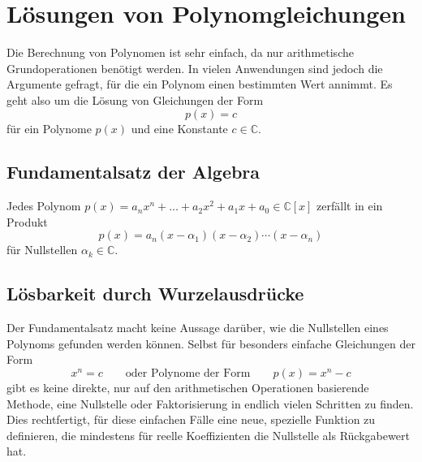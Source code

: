 %
%
%
\section{Lösungen von Polynomgleichungen
\label{buch:potenzen:section:loesungen}}
Die Berechnung von Polynomen ist sehr einfach, da nur arithmetische 
Grundoperationen benötigt werden.
In vielen Anwendungen sind jedoch die Argumente gefragt, für die ein
Polynom einen bestimmten Wert annimmt.
Es geht also um die Lösung von Gleichungen der Form
\[
p(x) = c
\]
für ein Polynome $p(x)$ und eine Konstante $c\in\mathbb{C}$.

%
%
\subsection{Fundamentalsatz der Algebra}

\begin{satz}[Gauss]
\label{buch:potenzen:satz:fundamentalsatz}
Jedes Polynom $p(x)=a_nx^n+\dots + a_2x^2 + a_1x + a_0\in\mathbb{C}[x]$
zerfällt in ein Produkt
\[
p(x)
=
a_n
(x-\alpha_1)(x-\alpha_2)\cdots(x-\alpha_n)
\]
für Nullstellen $\alpha_k\in\mathbb{C}$.
\end{satz}

%
%
\subsection{Lösbarkeit durch Wurzelausdrücke}
Der Fundamentalsatz macht keine Aussage darüber, wie die Nullstellen
eines Polynoms gefunden werden können.
Selbst für besonders einfache Gleichungen der Form
\[
x^n = c
\qquad
\text{oder Polynome der Form}
\qquad
p(x) = x^n -c
\]
gibt es keine direkte, nur auf den arithmetischen
Operationen basierende Methode, eine Nullstelle oder Faktorisierung
in endlich vielen Schritten zu finden.
Dies rechtfertigt, für diese einfachen Fälle eine neue, spezielle
Funktion zu definieren, die mindestens für reelle Koeffizienten 
die Nullstelle als Rückgabewert hat.

